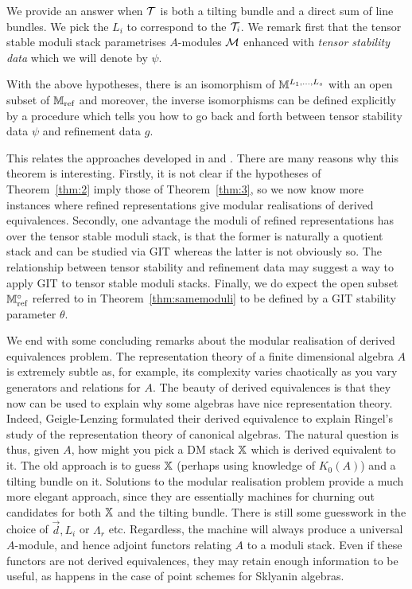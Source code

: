 \documentclass[12pt]{amsart}
\begin{document}
We provide an answer when $\mathcal{T}$ is both a tilting bundle and a direct sum of line bundles. We pick the $L_i$ to correspond to the $\mathcal{T}_i$. We remark first that the tensor stable moduli stack parametrises $A$-modules $\mathcal{M}$ enhanced with {\em tensor stability data} which we will denote by $\psi$.
\begin{theorem}  \label{thm:samemoduli}
With the above hypotheses, there is an isomorphism of $\mathbb{M}^{L_1,\ldots,L_s}$ with an open subset of $\mathbb{M}_{\textup{ref}}$ and moreover, the inverse isomorphisms can be defined explicitly by a procedure which tells you how to go back and forth between tensor stability data $\psi$ and refinement data $g$.
\end{theorem}
This relates the approaches developed in \cite{AU} and \cite{CL}. There are many reasons why this theorem is interesting. Firstly, it is not clear if the hypotheses of Theorem~\ref{thm:2} imply those of Theorem~\ref{thm:3}, so we now know more instances where refined representations give modular realisations of derived equivalences. Secondly, one advantage the moduli of refined representations has over the tensor stable moduli stack, is that the former is naturally a quotient stack and can be studied via GIT whereas the latter is not obviously so. The relationship between tensor stability and refinement data may suggest a way to apply GIT to tensor stable moduli stacks. Finally, we do expect the open subset $\mathbb{M}_\text{ref}^\circ$ referred to in Theorem~\ref{thm:samemoduli} to be defined by a GIT stability parameter $\theta$.

We end with some concluding remarks about the modular realisation of derived equivalences problem. The representation theory of a finite dimensional algebra $A$ is extremely subtle as, for example, its complexity varies chaotically as you vary generators and relations for $A$. The beauty of derived equivalences is that they now can be used to explain why some algebras have nice representation theory. Indeed, Geigle-Lenzing formulated their derived equivalence to explain Ringel's study of the representation theory of canonical algebras. The natural question is thus, given $A$, how might you pick a DM stack $\mathbb{X}$ which is derived equivalent to it. The old approach is to guess $\mathbb{X}$ (perhaps using knowledge of $K_0(A)$) and a tilting bundle on it. Solutions to the modular realisation problem provide a much more elegant approach, since they are essentially machines for churning out candidates for both $\mathbb{X}$ and the tilting bundle. There is still some guesswork in the choice of $\vec{d}, L_i$ or $\Lambda_r$ etc. Regardless, the machine will always produce a universal $A$-module, and hence adjoint functors relating $A$ to a moduli stack. Even if these functors are not derived equivalences, they may retain enough information to be useful, as happens in the case of point schemes for Sklyanin algebras.  
\end{document}
